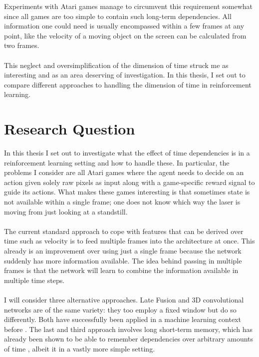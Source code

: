 Experiments with Atari games
manage to circumvent this requirement somewhat
since all games are too simple
to contain such long-term dependencies.
All information one could need is usually encompassed
within a few frames at any point,
like the velocity of a moving object on the screen
can be calculated from two frames.

\paragraph{}
This neglect and oversimplification of the dimension of time
struck me as interesting and as an area
deserving of investigation.
In this thesis,
I set out to compare different approaches
to handling the dimension of time in reinforcement learning.

\section{Research Question}
\label{sec:research_question}
In this thesis I set out to investigate
what the effect of time dependencies is
in a reinforcement learning setting
and how to handle these.
In particular,
the problems I consider
are all Atari games
where the agent needs to decide on an action
given solely raw pixels as input
along with a game-specific reward signal
to guide its actions.
What makes these games interesting is that sometimes
state is not available within a single frame;
one does not know which way the laser is moving
from just looking at a standstill.

\paragraph{}
The current standard approach to cope with
features that can be derived over time such as velocity
is to feed multiple frames into the architecture at once.
This already is an improvement over using just a single frame
because the network suddenly has more information available.
The idea behind passing in multiple frames
is that the network will learn to combine the information
available in multiple time steps.

\paragraph{}
I will consider three alternative approaches.
Late Fusion and 3D convolutional networks
are of the same variety:
they too employ a fixed window but
do so differently.
Both have successfully been applied in a machine learning context before
\parencite{Karpathy2014,Ji2013}.
The last and third approach involves
long short-term memory,
which has already been shown to be able to remember
dependencies over arbitrary amounts of time
\parencite{Bakker2001},
albeit it in a vastly more simple setting.

